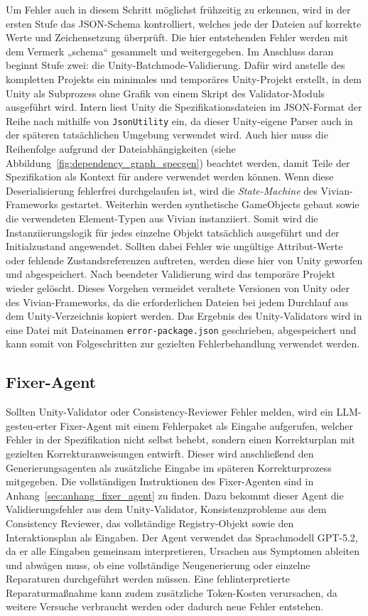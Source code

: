 Um Fehler auch in diesem Schritt möglichst frühzeitig zu erkennen, wird in der ersten Stufe das JSON-Schema kontrolliert, welches jede der Dateien auf korrekte Werte und Zeichensetzung überprüft. Die hier entstehenden Fehler werden mit dem Vermerk „schema“ gesammelt und weitergegeben. Im Anschluss daran beginnt Stufe zwei: die Unity-Batchmode-Validierung. Dafür wird anstelle des kompletten Projekts ein minimales und temporäres Unity-Projekt erstellt, in dem Unity als Subprozess ohne Grafik von einem Skript des Validator-Moduls ausgeführt wird. Intern liest Unity die Spezifikationsdateien im JSON-Format der Reihe nach mithilfe von \texttt{JsonUtility} ein, da dieser Unity-eigene Parser auch in der späteren tatsächlichen Umgebung verwendet wird. Auch hier muss die Reihenfolge aufgrund der Dateiabhängigkeiten (siehe Abbildung~\ref{fig:dependency_graph_specgen}) beachtet werden, damit Teile der Spezifikation als Kontext für andere verwendet werden können. Wenn diese Deserialisierung fehlerfrei durchgelaufen ist, wird die \textit{State-Machine} des Vivian-Frameworks gestartet. Weiterhin werden synthetische GameObjects gebaut sowie die verwendeten Element-Typen aus Vivian instanziiert. Somit wird die Instanziierungslogik für jedes einzelne Objekt tatsächlich ausgeführt und der Initialzustand angewendet. Sollten dabei Fehler wie ungültige Attribut-Werte oder fehlende Zustandsreferenzen auftreten, werden diese hier von Unity geworfen und abgespeichert. Nach beendeter Validierung wird das temporäre Projekt wieder gelöscht. Dieses Vorgehen vermeidet veraltete Versionen von Unity oder des Vivian-Frameworks, da die erforderlichen Dateien bei jedem Durchlauf aus dem Unity-Verzeichnis kopiert werden. Das Ergebnis des Unity-Validators wird in eine Datei mit Dateinamen \texttt{error-package.json} geschrieben, abgespeichert und kann somit von Folgeschritten zur gezielten Fehlerbehandlung verwendet werden.

\subsection*{Fixer-Agent}

Sollten Unity-Validator oder Consistency-Reviewer Fehler melden, wird ein LLM-gesteu-\newline{}erter Fixer-Agent mit einem Fehlerpaket als Eingabe aufgerufen, welcher Fehler in der Spezifikation nicht selbst behebt, sondern einen Korrekturplan mit gezielten Korrekturanweisungen entwirft. Dieser wird anschließend den Generierungsagenten als zusätzliche Eingabe im späteren Korrekturprozess mitgegeben. Die vollständigen Instruktionen des Fixer-Agenten sind in Anhang~\ref{sec:anhang_fixer_agent} zu finden. Dazu bekommt dieser Agent die Validierungsfehler aus dem Unity-Validator, Konsistenzprobleme aus dem Consistency Reviewer, das vollständige Registry-Objekt sowie den Interaktionsplan als Eingaben. Der Agent verwendet das Sprachmodell GPT-5.2, da er alle Eingaben gemeinsam interpretieren, Ursachen aus Symptomen ableiten und abwägen muss, ob eine vollständige Neugenerierung oder einzelne Reparaturen durchgeführt werden müssen. Eine fehlinterpretierte Reparaturmaßnahme kann zudem zusätzliche Token-Kosten verursachen, da weitere Versuche verbraucht werden oder dadurch neue Fehler entstehen.

